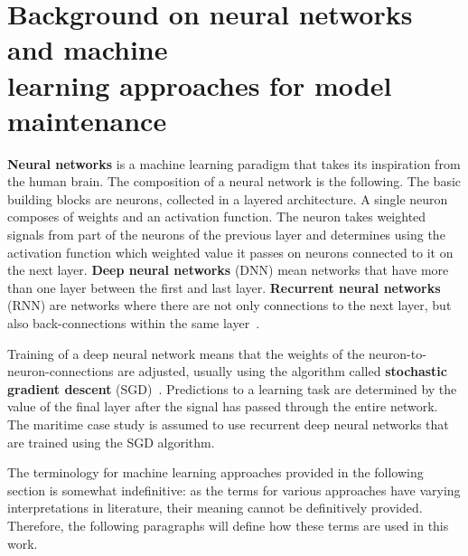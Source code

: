 \section[Background on neural networks and machine learning approaches for model maintenance]{Background on neural networks and machine\\ learning approaches for model maintenance}

\textbf{Neural networks} is a machine learning paradigm that takes its inspiration from the human brain. The composition of a neural network is the following. The basic building blocks are neurons, collected in a layered architecture. A single neuron composes of weights and an activation function. The neuron takes weighted signals from part of the neurons of the previous layer and determines using the activation function which weighted value it passes on neurons connected to it on the next layer. \textbf{Deep neural networks} (DNN) mean networks that have more than one layer between the first and last layer. \textbf{Recurrent neural networks} (RNN) are networks where there are not only connections to the next layer, but also back-connections within the same layer~\cite{ben-nunDemystifyingParallelDistributed2019}. 

 Training of a deep neural network means that the weights of the neuron-to-neuron-connections are adjusted, usually using the algorithm called \textbf{stochastic gradient descent} (SGD)~\cite{ben-nunDemystifyingParallelDistributed2019}. Predictions to a learning task are determined by the value of the final layer after the signal has passed through the entire network. The maritime case study is assumed to use recurrent deep neural networks that are trained using the SGD algorithm.

The terminology for machine learning approaches provided in the following section is somewhat indefinitive: as the terms for various approaches have varying interpretations in literature, their meaning cannot be definitively provided. Therefore, the following paragraphs will define how these terms are used in this work.

